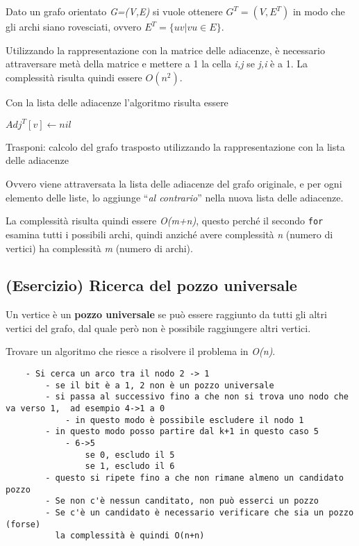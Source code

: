 Dato un grafo orientato \emph{G=(V,E)} si vuole ottenere $ G^T = (V, E^T)$ in modo che gli archi siano rovesciati, ovvero $E^T = \{uv | vu \in E\}$.

Utilizzando la rappresentazione con la matrice delle adiacenze, è
necessario attraversare metà della matrice e mettere a 1 la cella
\emph{i,j} se \emph{j,i} è a 1. La complessità risulta quindi essere
$O(n^2)$.

Con la lista delle adiacenze l'algoritmo risulta essere


\begin{algorithm}
	\begin{algorithmic}[1]
				\State $Adj^T[v] \gets nil$
			\EndFor
				\EndWhile
			\EndFor
		\EndFunction
	\end{algorithmic}
	\caption{Trasponi: calcolo del grafo trasposto utilizzando la rappresentazione con la lista delle adiacenze}
\end{algorithm}

Ovvero viene attraversata la lista delle adiacenze del grafo originale,
e per ogni elemento delle liste, lo aggiunge ``\emph{al contrario}''
nella nuova lista delle adiacenze.

La complessità risulta quindi essere \emph{O(m+n)}, questo perché il
secondo \texttt{for} esamina tutti i possibili archi, quindi anziché
avere complessità \emph{n} (numero di vertici) ha complessità \emph{m}
(numero di archi).

\subsection{(Esercizio) Ricerca del pozzo
universale}\label{esericizio-ricerca-del-pozzo-universale}

Un vertice è un \textbf{pozzo universale} se può essere raggiunto da
tutti gli altri vertici del grafo, dal quale però non è possibile
raggiungere altri vertici.

Trovare un algoritmo che riesce a risolvere il problema in \emph{O(n)}.


\begin{verbatim}
	- Si cerca un arco tra il nodo 2 -> 1
		- se il bit è a 1, 2 non è un pozzo universale
		- si passa al successivo fino a che non si trova uno nodo che va verso 1,  ad esempio 4->1 a 0
			- in questo modo è possibile escludere il nodo 1
		- in questo modo posso partire dal k+1 in questo caso 5
			- 6->5
				se 0, escludo il 5
				se 1, escludo il 6
		- questo si ripete fino a che non rimane almeno un candidato pozzo
		- Se non c'è nessun canditato, non può esserci un pozzo
		- Se c'è un candidato è necessario verificare che sia un pozzo (forse)
		  la complessità è quindi O(n+n)
\end{verbatim}